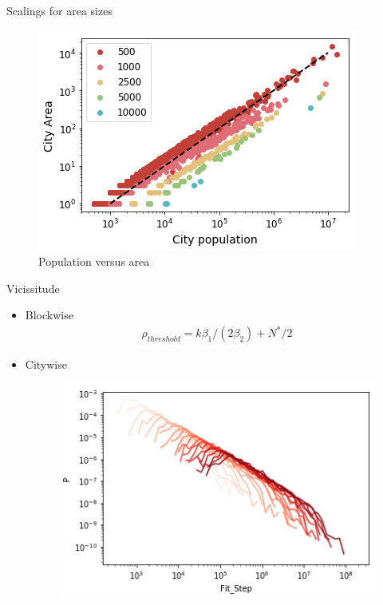 \documentclass{beamer}
\begin{document}
\begin{frame}{Scalings for area sizes}

  \begin{figure}
    \includegraphics[width = 0.8\linewidth]{pics/pop-area.png}
    \caption{Population versus area}
  \end{figure}
\end{frame}

\begin{frame}{Vicissitude}
  \begin{itemize}
    \item Blockwise
  \begin{align}\rho_{threshold} = k\beta_1/(2\beta_2)+N^*/2\end{align}
    \item Citywise
    \begin{figure}
      \includegraphics[width = 0.8\linewidth]{pics/step_number.png}
    \end{figure}
  \end{itemize}
\end{frame}
\end{document}
